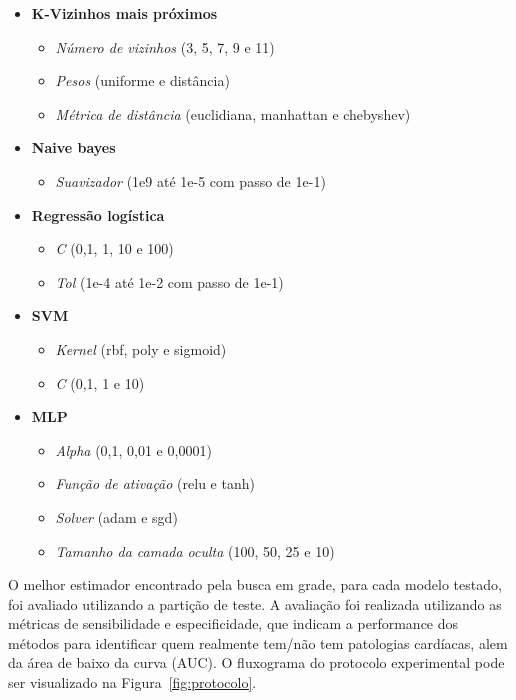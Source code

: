\begin{itemize}
    \item \textbf{K-Vizinhos mais próximos}
          \begin{itemize}
              \item \textit{Número de vizinhos} (3, 5, 7, 9 e 11)
              \item \textit{Pesos} (uniforme e distância)
              \item \textit{Métrica de distância} (euclidiana, manhattan e chebyshev)
          \end{itemize}
    \item \textbf{Naive bayes}
          \begin{itemize}
              \item \textit{Suavizador} (1e9 até 1e-5 com passo de 1e-1)
          \end{itemize}
    \item \textbf{Regressão logística}
          \begin{itemize}
              \item \textit{C} (0,1, 1, 10 e 100)
              \item \textit{Tol} (1e-4 até 1e-2 com passo de 1e-1)
          \end{itemize}
    \item \textbf{SVM}
          \begin{itemize}
              \item \textit{Kernel} (rbf, poly e sigmoid)
              \item \textit{C} (0,1, 1 e 10)
          \end{itemize}
    \item \textbf{MLP}
          \begin{itemize}
              \item \textit{Alpha} (0,1, 0,01 e 0,0001)
              \item \textit{Função de ativação} (relu e tanh)
              \item \textit{Solver} (adam e sgd)
              \item \textit{Tamanho da camada oculta} (100, 50, 25 e 10)
          \end{itemize}
\end{itemize}

O melhor estimador encontrado pela busca em grade, para cada modelo testado, foi avaliado utilizando a partição de teste. A avaliação foi realizada utilizando as métricas de sensibilidade e especificidade, que indicam a performance dos métodos para identificar quem realmente tem/não tem patologias cardíacas, alem da área de baixo da curva (AUC). O fluxograma do protocolo experimental pode ser visualizado na Figura~\ref{fig:protocolo}.

